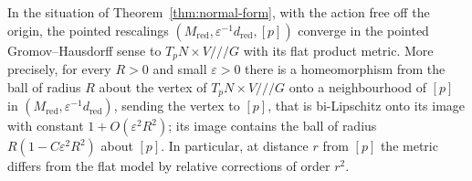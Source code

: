 \begin{proposition}\label{prop:tangent-cone}
In the situation of Theorem~\ref{thm:normal-form}, with the action free off the origin, the
pointed rescalings $(M_{\mathrm{red}},\varepsilon^{-1}d_{\mathrm{red}},[p])$ converge in the
pointed Gromov--Hausdorff sense to $T_pN\times V/\!/\!/G$ with its flat product metric. More
precisely, for every $R>0$ and small $\varepsilon>0$ there is a homeomorphism from the ball of radius
$R$ about the vertex of $T_pN\times V/\!/\!/G$ onto a neighbourhood of $[p]$ in
$(M_{\mathrm{red}},\varepsilon^{-1}d_{\mathrm{red}})$, sending the vertex to $[p]$, that is bi-Lipschitz
onto its image with constant $1+O(\varepsilon^2R^2)$; its image contains the ball of radius
$R(1-C\varepsilon^2R^2)$ about $[p]$. In particular, at distance $r$ from $[p]$ the metric differs from the flat
model by relative corrections of order $r^2$.
\end{proposition}

